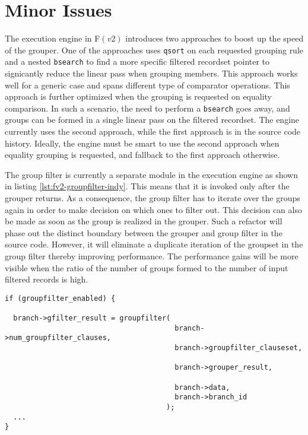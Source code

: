\section{Minor Issues}\label{sec:minor-issues}




The execution engine in F$(v2)$ introduces two approaches to boost up the speed
of the grouper. One of the approaches uses \texttt{qsort} on each requested
grouping rule and a nested \texttt{bsearch} to find a more specific filtered
recordset pointer to signicantly reduce the linear pass when grouping members.
This approach works well for a generic case and spans different type of
comparator operations. This approach is further optimized when the grouping is
requested on equality comparison. In such a scenario, the
 need to
perform a \texttt{bsearch} goes away, and groups can be formed in a single
linear pass on the filtered recordset. The engine currently uses the second
approach, while the first approach is in the source code history. Ideally, the
engine must be smart to use the second approach when equality grouping is
requested, and fallback to the first approach otherwise.




The group filter is currently a separate module in the execution engine
as shown in listing \ref{lst:fv2-groupfilter-indy}. This means that it
is invoked only after the grouper returns. As a consequence, the group
filter has to iterate over the groups again in order to make decision on
which ones to filter out. This decision can also be  made as soon as the group is realized in the grouper. Such
a refactor will phase out the distinct boundary between the grouper and
group filter in the source code.  However, it will eliminate a duplicate
iteration of the groupset in the group filter thereby improving
performance. The performance gains will be more visible when the ratio
of the number of groups formed to the number of input filtered records
is high.

\begin{lstlisting}
if (groupfilter_enabled) {

  branch->gfilter_result = groupfilter(
                                        branch->num_groupfilter_clauses,
                                        branch->groupfilter_clauseset,

                                        branch->grouper_result,

                                        branch->data,
                                        branch->branch_id
                                      );
  ...
}
\end{lstlisting}


